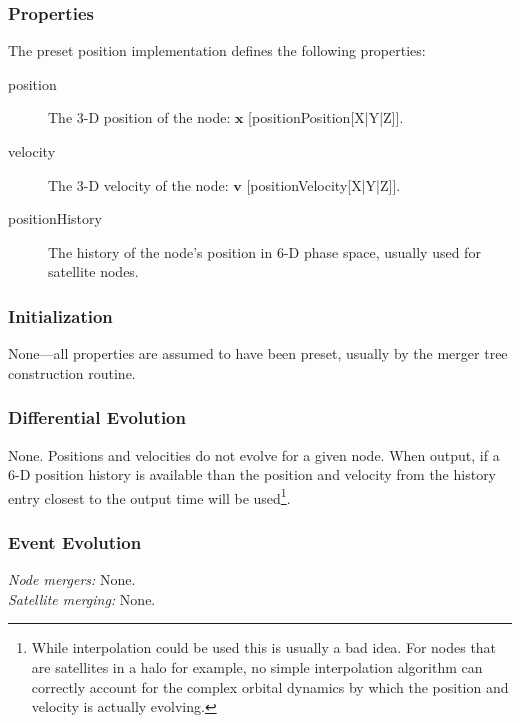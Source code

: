 \subsubsection{Properties}

The preset position implementation defines the following properties:
\begin{description}
 \item [{\normalfont \ttfamily position}] The 3-D position of the node: ${\mathbf x}$ [{\normalfont \ttfamily positionPosition[X|Y|Z]}].
 \item [{\normalfont \ttfamily velocity}] The 3-D velocity of the node: ${\mathbf v}$ [{\normalfont \ttfamily positionVelocity[X|Y|Z]}].
 \item [{\normalfont \ttfamily positionHistory}] The history of the node's position in 6-D phase space, usually used for satellite nodes.
\end{description}

\subsubsection{Initialization}

None---all properties are assumed to have been preset, usually by the merger tree construction routine.

\subsubsection{Differential Evolution}

None. Positions and velocities do not evolve for a given node. When output, if a 6-D position history is available than the position and velocity from the history entry closest to the output time will be used\footnote{While interpolation could be used this is usually a bad idea. For nodes that are satellites in a halo for example, no simple interpolation algorithm can correctly account for the complex orbital dynamics by which the position and velocity is actually evolving.}.

\subsubsection{Event Evolution}

\noindent\emph{Node mergers:} None.\\

\noindent\emph{Satellite merging:} None.\\

